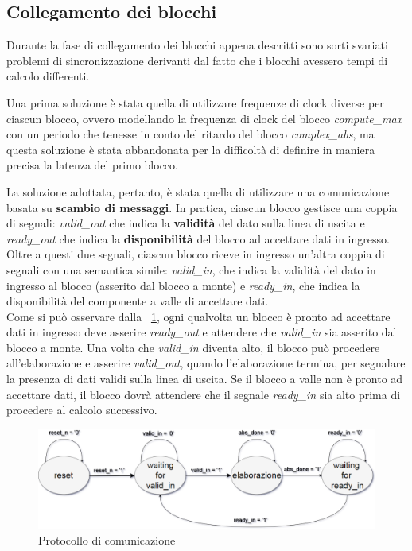 \documentclass[12pt,a4paper,twoside,openany]{book}
\begin{document}
\subsection{Collegamento dei blocchi}
Durante la fase di collegamento dei blocchi appena descritti sono sorti svariati problemi di sincronizzazione derivanti dal fatto che i blocchi avessero tempi di calcolo differenti. 

Una prima soluzione è stata quella di utilizzare frequenze di clock diverse per ciascun blocco, ovvero modellando la frequenza di clock del blocco \textit{compute\_max} con un periodo che tenesse in conto del ritardo del blocco \textit{complex\_abs}, ma questa soluzione è stata abbandonata per la difficoltà di definire in maniera precisa la latenza del primo blocco.

La soluzione adottata, pertanto, è stata quella di utilizzare una comunicazione basata su \textbf{scambio di messaggi}. In pratica, ciascun blocco gestisce una coppia di segnali: \textit{valid\_out} che indica la \textbf{validità} del dato sulla linea di uscita e \textit{ready\_out} che indica la \textbf{disponibilità} del blocco ad accettare dati in ingresso. Oltre a questi due segnali, ciascun blocco riceve in ingresso un'altra coppia di segnali con una semantica simile: \textit{valid\_in}, che indica la validità del dato in ingresso al blocco (asserito dal blocco a monte) e \textit{ready\_in}, che indica la disponibilità del componente a valle di accettare dati. \\
Come si può osservare dalla \figurename~\ref{wrapperabs_fsm}, ogni qualvolta un blocco è pronto ad accettare dati in ingresso deve asserire \textit{ready\_out} e attendere che \textit{valid\_in} sia asserito dal blocco a monte. Una volta che \textit{valid\_in} diventa alto, il blocco può procedere all'elaborazione e asserire \textit{valid\_out}, quando l'elaborazione termina, per segnalare la presenza di dati validi sulla linea di uscita. Se il blocco a valle non è pronto ad accettare dati, il blocco dovrà attendere che il segnale \textit{ready\_in} sia alto prima di procedere al calcolo successivo.

\begin{figure}
\begin{center}
\includegraphics[scale=0.35, keepaspectratio]{immagini/fsm_wrapper_abs}
\caption{Protocollo di comunicazione}
\label{wrapperabs_fsm}
\end{center}
\end{figure}
\end{document}
